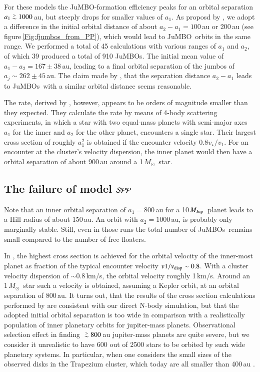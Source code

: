 \documentclass[submission,phys]{lib/SciPost}
\newcommand{\MSun}{\mbox{${M}_\odot$}}
\newcommand{\MJup}{\mbox{${M}_{\rm Jup}$}}
\def\apgt{\ {\raise-.5ex\hbox{$\buildrel>\over\sim$}}\ }
\newcommand{\jumbo}{\mbox{JuMBO}}
\newcommand{\jumbos}{\mbox{JuMBOs}}
\begin{document}
For these models the \jumbo-formation efficiency peaks for an orbital
separation $a_1 \apgt 1000$\,au, but steeply drops for smaller values
of $a_1$. As proposd by \cite{2023arXiv231006016W}, we adopt a
difference in the initial orbital distance of about $a_2-a_1 =
100$\,au or 200\,au (see figure\,\ref{Fig:fjumbos_from_PP}), which
would lead to \jumbo\, orbits in the same range.  We performed a total
of 45 calculations with various ranges of $a_1$ and $a_2$, of which 39
produced a total of 910 \jumbos. The initial mean value of $a_1-a_2 =
167\pm38$\,au, leading to a final orbital separation of the jumbos of
$a_j \sim 262\pm45$\,au.  The claim made by
\cite{2023arXiv231006016W}, that the separation distance $a_2-a_1$
leads to \jumbos\, with a similar orbital distance seems reasonable.

The rate, derived by \cite{2023arXiv231006016W}, however, appears to
be orders of magnitude smaller than they expected.  They calculate the
rate by means of 4-body scattering experiments, in which a star with
two equal-mass planets with semi-major axes $a_1$ for the inner and
$a_2$ for the other planet, encounters a single star. Their largest
cross section of roughly $a_1^2$ is obtained if the encounter velocity
$0.8v_\star/v_1$. For an encounter at the cluster's velocity
dispersion, the inner planet would then have a orbital separation of
about 900\,au around a 1\,\MSun\, star.

\subsection{The failure of model ${\cal SPP}$}

Note that an inner orbital separation of $a_1=800$\,au for a
10\,\MJup\, planet leads to a Hill radius of about 150\,au. An orbit
with $a_2=1000$\,au, is probably only marginally stable.  Still,
even in those runs the total number of \jumbos\, remains small
compared to the number of free floaters.

In \cite{2023arXiv231006016W}, the highest cross section is achieved
for the orbital velocity of the inner-most planet as fraction of the
typical encounter velocity $v1/v_{\rm disp} \sim 0.8$. With a cluster
velocity dispersion of $\sim 0.8$\,km/s, the orbital velocity roughly
1\,km/s. Around an 1\,\MSun\, star such a velocity is obtained,
assuming a Kepler orbit, at an orbital separation of 800\,au. It turns
out, that the results of the cross section calculations performed by
\cite{2023arXiv231006016W} are consistent with our direct N-body
simulation, but that the adopted initial orbital separation is too
wide in comparison with a realistically population of inner planetary
orbits for jupiter-mass planets.  Observational selection effect in
finding $\apgt 800$\,au jupiter-mass planets are quite severe, but we
consider it unrealistic to have 600 out of 2500 stars to be orbited by
such wide planetary systems. In particular, when one considers the
small sizes of the observed disks in the Trapezium cluster, which
today are all smaller than 400\,au \cite{2005A&A...441..195V}.
\end{document}
